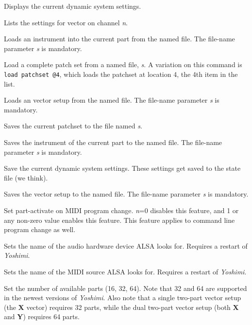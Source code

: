       Displays the current dynamic system settings.

      Lists the settings for vector on channel \textsl{n}.

      Loads an instrument into the current part from the named file.
      The file-name parameter \textsl{s} is mandatory.

      Load a complete patch set from a named file, \textsl{s}.
      A variation on this command is \texttt{load patchset @4}, which
      loads the patchset at location 4, the 4th item in the list.

      Loads an vector setup from the named file.
      The file-name parameter \textsl{s} is mandatory.

      Saves the current patchset to the file named \textsl{s}.

      Saves the instrument of the current part to the named file.
      The file-name parameter \textsl{s} is mandatory.

      Save the current dynamic system settings.
      These settings get saved to the state file (we think).

      Saves the vector setup to the named file.
      The file-name parameter \textsl{s} is mandatory.

      Set part-activate on MIDI program change.
      \textsl{n}=0 disables this feature, and
      1 or any non-zero value enables this feature.
      This feature applies to command line program change as well.

      Sets the name of the audio hardware device ALSA looks for.
      Requires a restart of \textsl{Yoshimi}.

      Sets the name of the MIDI source ALSA looks for.
      Requires a restart of \textsl{Yoshimi}.

      Set the number of available parts (16, 32, 64).
      Note that 32 and 64 are supported in the newest versions of
      \textsl{Yoshimi}.  Also note that a single two-part vector setup (the
      \textbf{X} vector) requires 32 parts, while the dual two-part vector
      setup (both \textbf{X} and \textbf{Y}) requires 64 parts.

